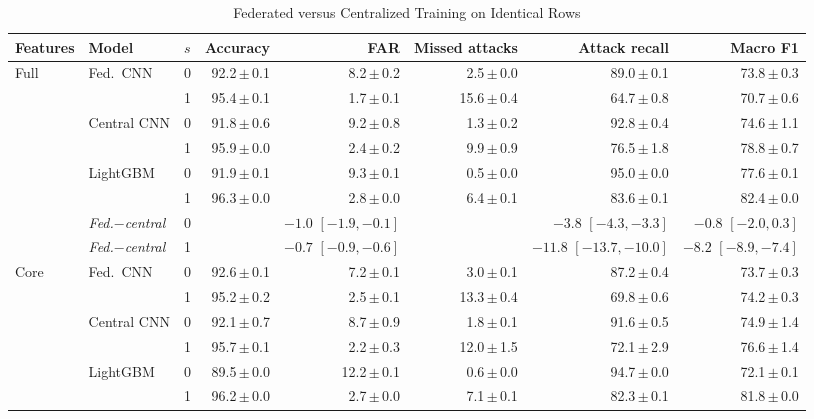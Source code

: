 \begin{table}[t]
\centering
\scriptsize
\caption{Federated versus Centralized Training on Identical Rows}
\label{tab:fedcentral}
\setlength{\tabcolsep}{3pt}
\begin{tabular}{lllrrrrr}
\toprule
Features & Model & $s$ & Accuracy & FAR & Missed attacks & Attack recall & Macro F1 \\
\midrule
Full & Fed.\ CNN & 0 & 92.2{\,}$\pm${\,}0.1 & 8.2{\,}$\pm${\,}0.2 & 2.5{\,}$\pm${\,}0.0 & 89.0{\,}$\pm${\,}0.1 & 73.8{\,}$\pm${\,}0.3 \\
 &  & 1 & 95.4{\,}$\pm${\,}0.1 & 1.7{\,}$\pm${\,}0.1 & 15.6{\,}$\pm${\,}0.4 & 64.7{\,}$\pm${\,}0.8 & 70.7{\,}$\pm${\,}0.6 \\
 & Central CNN & 0 & 91.8{\,}$\pm${\,}0.6 & 9.2{\,}$\pm${\,}0.8 & 1.3{\,}$\pm${\,}0.2 & 92.8{\,}$\pm${\,}0.4 & 74.6{\,}$\pm${\,}1.1 \\
 &  & 1 & 95.9{\,}$\pm${\,}0.0 & 2.4{\,}$\pm${\,}0.2 & 9.9{\,}$\pm${\,}0.9 & 76.5{\,}$\pm${\,}1.8 & 78.8{\,}$\pm${\,}0.7 \\
 & LightGBM & 0 & 91.9{\,}$\pm${\,}0.1 & 9.3{\,}$\pm${\,}0.1 & 0.5{\,}$\pm${\,}0.0 & 95.0{\,}$\pm${\,}0.0 & 77.6{\,}$\pm${\,}0.1 \\
 &  & 1 & 96.3{\,}$\pm${\,}0.0 & 2.8{\,}$\pm${\,}0.0 & 6.4{\,}$\pm${\,}0.1 & 83.6{\,}$\pm${\,}0.1 & 82.4{\,}$\pm${\,}0.0 \\
 & \emph{Fed.$-$central} & 0 & & $-1.0$ $[-1.9, -0.1]$ & & $-3.8$ $[-4.3, -3.3]$ & $-0.8$ $[-2.0, 0.3]$ \\
 & \emph{Fed.$-$central} & 1 & & $-0.7$ $[-0.9, -0.6]$ & & $-11.8$ $[-13.7, -10.0]$ & $-8.2$ $[-8.9, -7.4]$ \\
\midrule
Core & Fed.\ CNN & 0 & 92.6{\,}$\pm${\,}0.1 & 7.2{\,}$\pm${\,}0.1 & 3.0{\,}$\pm${\,}0.1 & 87.2{\,}$\pm${\,}0.4 & 73.7{\,}$\pm${\,}0.3 \\
 &  & 1 & 95.2{\,}$\pm${\,}0.2 & 2.5{\,}$\pm${\,}0.1 & 13.3{\,}$\pm${\,}0.4 & 69.8{\,}$\pm${\,}0.6 & 74.2{\,}$\pm${\,}0.3 \\
 & Central CNN & 0 & 92.1{\,}$\pm${\,}0.7 & 8.7{\,}$\pm${\,}0.9 & 1.8{\,}$\pm${\,}0.1 & 91.6{\,}$\pm${\,}0.5 & 74.9{\,}$\pm${\,}1.4 \\
 &  & 1 & 95.7{\,}$\pm${\,}0.1 & 2.2{\,}$\pm${\,}0.3 & 12.0{\,}$\pm${\,}1.5 & 72.1{\,}$\pm${\,}2.9 & 76.6{\,}$\pm${\,}1.4 \\
 & LightGBM & 0 & 89.5{\,}$\pm${\,}0.0 & 12.2{\,}$\pm${\,}0.1 & 0.6{\,}$\pm${\,}0.0 & 94.7{\,}$\pm${\,}0.0 & 72.1{\,}$\pm${\,}0.1 \\
 &  & 1 & 96.2{\,}$\pm${\,}0.0 & 2.7{\,}$\pm${\,}0.0 & 7.1{\,}$\pm${\,}0.1 & 82.3{\,}$\pm${\,}0.1 & 81.8{\,}$\pm${\,}0.0 \\

\end{tabular}
\end{table}

